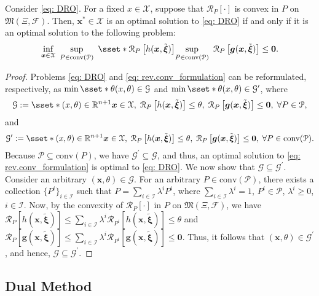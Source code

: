 \documentclass[final,onefignum,onetabnum]{class}
\newcommand{\rrisk}[2]{\Cs{R}_{#1} \left[ #2 \right]}
\newcommand{\bs}[1]{\boldsymbol{#1}} %
\newcommand{\Bs}[1]{\mathbb{#1}} %
\newcommand{\Cs}[1]{\mathcal{#1}} %
\newcommand{\Fs}[1]{\mathfrak{#1}} %
\newcommand{\txi}{\tilde{\bs{\xi}}}
\newcommand{\measurespace}{\left( \Xi, \Cs{F} \right)}
\newcommand{\conv}[1]{\text{conv}(#1)}
\begin{document}
\begin{lemma}
	\label{lem: G_Convex_Hull}
	Consider \eqref{eq: DRO}. For a fixed $x \in \Cs{X}$, suppose that $\rrisk{P}{\cdot}$ is  convex in $P$ on $\Fs{M}\measurespace$. Then, $\bs{x}^{*} \in \Cs{X}$ is an optimal solution to \eqref{eq: DRO} if and only if it is an optimal solution to the following problem: 
	\begin{equation}
	    \label{eq: rev.conv_formulation}
        \inf_{\bs{x} \in \Cs{X} } \ \sup_{P \in \conv{\Cs{P}}} \ 	\sset*{\rrisk{P}{h(\bs{x},\txi)}}{\sup_{P \in \conv{\Cs{P}} } \ \rrisk{P }{\bs{g}(\bs{x},\txi)} \le \bs{0}}.
    \end{equation}
\end{lemma}

\begin{proof}
    Problems  \eqref{eq: DRO} and \eqref{eq: rev.conv_formulation} can be reformulated, respectively, as  \linebreak $\min \sset*{\theta}{(x,\theta) \in \Cs{G}}$ and $\min \sset*{\theta}{(x,\theta) \in \Cs{G}^{\prime}}$, where 
    $$\Cs{G}:=\sset*{(x,\theta) \in \Bs{R}^{n+1}}{\bs{x} \in \Cs{X}, \; \rrisk{P}{h(\bs{x},\txi)} \le \theta, \; \rrisk{P}{\bs{g}(\bs{x},\txi)} \le \bs{0}, \;  \forall P \in \Cs{P}},$$
    and 
    $$\Cs{G}^{\prime}:=\sset*{(x,\theta) \in \Bs{R}^{n+1}}{\bs{x} \in \Cs{X}, \; \rrisk{P}{h(\bs{x},\txi)} \le \theta, \; \rrisk{P}{\bs{g}(\bs{x},\txi)} \le \bs{0}, \;  \forall P \in \conv{\Cs{P}}}.$$
    Because $\Cs{P} \subseteq \conv{P}$, we have $\Cs{G}^{\prime} \subseteq \Cs{G}$, and thus, an optimal solution to \eqref{eq: rev.conv_formulation} is optimal to \eqref{eq: DRO}. We now show that $\Cs{G} \subseteq \Cs{G}^{\prime} $. Consider an arbitrary $(\bs{x},\theta) \in \Cs{G}$.  For an arbitrary $P \in \conv{\Cs{P}}$, there exists a collection $\{P^{i}\}_{i \in \Cs{I}}$ such that $P=\sum_{i \in \Cs{I}} \lambda^{i} P^{i}$, where $\sum_{i \in \Cs{I}} \lambda^{i} =1$, $ P^{i} \in \Cs{P}$, $\lambda^{ i} \ge 0$, $i \in \Cs{I}$. Now, by the convexity of $\rrisk{P}{\cdot}$ in $P$ on $\Fs{M}\measurespace$, we have $\rrisk{P}{h(\bs{x},\txi)} \le \sum_{i \in \Cs{I}} \lambda^{i} \rrisk{P^{i}}{h(\bs{x},\txi)} \le \theta$ and $\rrisk{P}{\bs{g}(\bs{x},\txi)} \le \sum_{i \in \Cs{I}} \lambda^{i} \rrisk{P^{i}}{\bs{g}(\bs{x},\txi)} \le \bs{0}$. Thus, it follows that $(\bs{x},\theta) \in \Cs{G}^{\prime}$, and hence, $\Cs{G} \subseteq \Cs{G}^{\prime} $. 
\end{proof}

\subsection{Dual Method}
\end{document}

